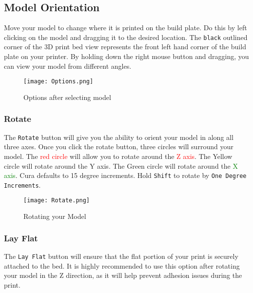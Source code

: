 \subsection{Model Orientation}
Move your model to change where it is printed on the build plate. Do this by left clicking on the model and dragging it to the desired location. The \texttt{black} outlined corner of the 3D print bed view represents the front left hand corner of the build plate on your printer. By holding down the right mouse button and dragging, you can view your model from different angles. %
\begin{figure}[H]
\centering
\texttt{[image: Options.png]}
\caption{Options after selecting model}
\label{fig:Orientation}
\end{figure}

\subsubsection{Rotate}
The \texttt{Rotate} button will give you the ability to orient your model in along all three axes. Once you click the rotate button, three circles will surround your model. The \textcolor{red}{red circle} will allow you to rotate around the \textcolor{red}{Z axis}. The \textcolor{yellow1}{Yellow circle} will rotate around the \textcolor{yellow1}{Y axis}. The \textcolor{green1}{Green circle} will rotate around the \textcolor{green}{X axis}. Cura defaults to 15 degree increments. Hold \texttt{Shift} to rotate by \texttt{One Degree Increments}.
\begin{figure}[H]
\centering
\texttt{[image: Rotate.png]}
\caption{Rotating your Model}
\label{fig:Rotating your Model}
\end{figure}

\subsubsection{Lay Flat}
The \texttt{Lay Flat} button will ensure that the flat portion of your print is securely attached to the bed. It is highly recommended to use this option after rotating your model in the Z direction, as it will help prevent adhesion issues during the print.

